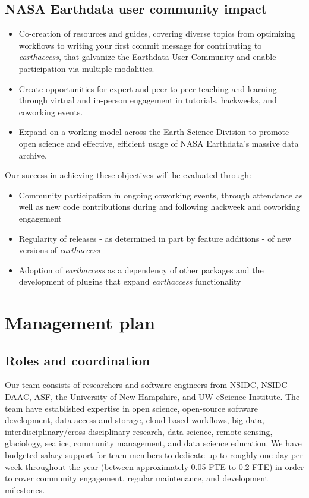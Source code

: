 \documentclass{ROSES-NASA-proposal}
\newcommand{\earthaccess}{\textit{earthaccess}\xspace} %
\begin{document}
\subsection{NASA Earthdata user community impact}

\begin{itemize}[itemsep=-.1em]
    \item Co-creation of resources and guides, covering diverse topics from optimizing workflows to writing your first commit message for contributing to \earthaccess, that galvanize the Earthdata User Community and enable participation via multiple modalities.
    \item Create opportunities for expert and peer-to-peer teaching and learning through virtual and in-person engagement in tutorials, hackweeks, and coworking events.
    \item Expand on a working model across the Earth Science Division to promote open science and effective, efficient usage of NASA Earthdata's massive data archive.
\end{itemize}

Our success in achieving these objectives will be evaluated through:
\begin{itemize}[itemsep=-.1em]
    \item Community participation in ongoing coworking events, through attendance as well as new code contributions during and following hackweek and coworking engagement
    \item Regularity of releases - as determined in part by feature additions - of new versions of \earthaccess
    \item Adoption of \earthaccess as a dependency of other packages and the development of plugins that expand \earthaccess functionality

\end{itemize}
 
\section{Management plan}

\subsection{Roles and coordination}

Our team consists of researchers and software engineers from NSIDC, NSIDC DAAC, ASF, the University of New Hampshire, and UW eScience Institute. The team have established expertise in open science, open-source software development, data access and storage, cloud-based workflows, big data, interdisciplinary/cross-disciplinary research, data science, remote sensing, glaciology, sea ice, community management, and data science education. We have budgeted salary support for team members to dedicate up to roughly one day per week throughout the year (between approximately 0.05 FTE to 0.2 FTE) in order to cover community engagement, regular maintenance, and development milestones.
\end{document}
